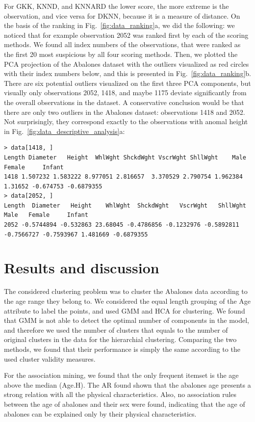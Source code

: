 \documentclass[10pt, paper=a4]{article}
\begin{document}
For GKK, KNND, and KNNARD the lower score, the more extreme is the observation,
and vice versa for DKNN, because it is a measure of distance.  On the basis of
the ranking in Fig.~\ref{fig:data_ranking}a, we did the following: we noticed
that for example observation 2052 was ranked first by each of the scoring
methods.  We found all index numbers of the observations, that were ranked as
the first 20 most suspicious by all four scoring methods.  Then, we plotted the
PCA projection of the Abalones dataset with the outliers visualized as red
circles with their index numbers below, and this is presented in
Fig.~\ref{fig:data_ranking}b.  There are six potential outliers visualized on
the first three PCA components, but visually only observations 2052, 1418, and
maybe 1175 deviate significantly from the overall observations in the dataset.
A conservative conclusion would be that there are only two outliers in the
Abalones dataset: observations 1418 and 2052.  Not surprisingly, they correspond
exactly to the observations with anomal height in
Fig.~\ref{fig:data_descriptive_analysis}a:
\begin{verbatim}
> data[1418, ]
Length Diameter   Height  WhlWght ShckdWght VscrWght ShllWght    Male    Female     Infant
1418 1.507232 1.583222 8.977051 2.816657  3.370529 2.790754 1.962384 1.31652 -0.674753 -0.6879355
> data[2052, ]
Length  Diameter   Height    WhlWght  ShckdWght   VscrWght   ShllWght       Male   Female     Infant
2052 -0.5744894 -0.532863 23.68045 -0.4786856 -0.1232976 -0.5892811 -0.7566727 -0.7593967 1.481669 -0.6879355
\end{verbatim}

\section{Results and discussion}
\label{sec:results_and_discussion}
The considered clustering problem was to cluster the Abalones data according to
the age range they belong to.  We considered the equal length grouping of the
Age attribute to label the points, and used GMM and HCA for clustering.  We
found that GMM is not able to detect the optimal number of components in the
model, and therefore we used the number of clusters that equals to the number of
original clusters in the data for the hierarchial clustering.  Comparing the two
methods, we found that their performance is simply the same according to the
used cluster validity measures.

For the association mining, we found that the only frequent itemset is the age
above the median (Age.H).  The AR found shown that the abalones age presents a
strong relation with all the physical characteristics.  Also, no association
rules between the age of abalones and their sex were found, indicating that the
age of abalones can be explained only by their physical characteristics.
\end{document}
